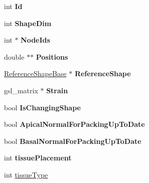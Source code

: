 \begin{DoxyCompactItemize}
\item 
\hypertarget{classShapeBase_ae097764dd4d607b54710d7ca0f7e12f8}{}int {\bfseries Id}\label{classShapeBase_ae097764dd4d607b54710d7ca0f7e12f8}

\item 
\hypertarget{classShapeBase_a4d740b60433d7a9104c2d09b0d52703d}{}int {\bfseries Shape\+Dim}\label{classShapeBase_a4d740b60433d7a9104c2d09b0d52703d}

\item 
\hypertarget{classShapeBase_a870e519202c84ef5a81fd35b059fdebe}{}int $\ast$ {\bfseries Node\+Ids}\label{classShapeBase_a870e519202c84ef5a81fd35b059fdebe}

\item 
\hypertarget{classShapeBase_ad6aa109b1f9c10680a0b601452bc78c2}{}double $\ast$$\ast$ {\bfseries Positions}\label{classShapeBase_ad6aa109b1f9c10680a0b601452bc78c2}

\item 
\hypertarget{classShapeBase_a4aee3861aaca88cf1b8e5bdc1ff7c872}{}\hyperlink{classReferenceShapeBase}{Reference\+Shape\+Base} $\ast$ {\bfseries Reference\+Shape}\label{classShapeBase_a4aee3861aaca88cf1b8e5bdc1ff7c872}

\item 
\hypertarget{classShapeBase_a4bda00f80968d836c647afe5f6d1fb36}{}gsl\+\_\+matrix $\ast$ {\bfseries Strain}\label{classShapeBase_a4bda00f80968d836c647afe5f6d1fb36}

\item 
\hypertarget{classShapeBase_a994acea5e6f2cf92c94f485e7ba5afc9}{}bool {\bfseries Is\+Changing\+Shape}\label{classShapeBase_a994acea5e6f2cf92c94f485e7ba5afc9}

\item 
\hypertarget{classShapeBase_ac2bab1161a08d0d953702b7c8d1ff032}{}bool {\bfseries Apical\+Normal\+For\+Packing\+Up\+To\+Date}\label{classShapeBase_ac2bab1161a08d0d953702b7c8d1ff032}

\item 
\hypertarget{classShapeBase_a189180583fb224af63900411b2da53c6}{}bool {\bfseries Basal\+Normal\+For\+Packing\+Up\+To\+Date}\label{classShapeBase_a189180583fb224af63900411b2da53c6}

\item 
\hypertarget{classShapeBase_aff63b1fcb823bbfdb5b19fe78dea59b8}{}int {\bfseries tissue\+Placement}\label{classShapeBase_aff63b1fcb823bbfdb5b19fe78dea59b8}

\item 
\hypertarget{classShapeBase_a1d56f7eb3fed744adc268bc4da7a790f}{}int \hyperlink{classShapeBase_a1d56f7eb3fed744adc268bc4da7a790f}{tissue\+Type}\label{classShapeBase_a1d56f7eb3fed744adc268bc4da7a790f}


\end{DoxyCompactItemize}
